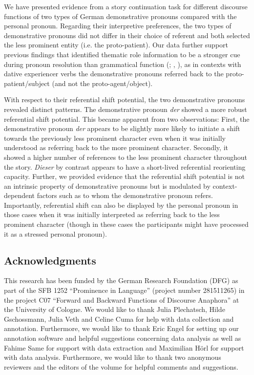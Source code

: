 \documentclass[output=paper,colorlinks,citecolor=brown]{langscibook}
\begin{document}
We have presented evidence from a story continuation task for different discourse functions of two types of German demonstrative pronouns compared with the personal pronoun. Regarding their interpretive preferences, the two types of demonstrative pronouns did not differ in their choice of referent and both selected the less prominent entity (i.e. the proto-patient). Our data further support previous findings that identified thematic role information to be a stronger cue during pronoun resolution than grammatical function (\citealt{StevensonEtAl1994}; \citealt{SchumacherEtAl2016}, \citeyear{SchumacherEtAl2017}), as in contexts with dative experiencer verbs the demonstrative pronouns referred back to the proto-patient/subject (and not the proto-agent/object). 

With respect to their referential shift potential, the two demonstrative pronouns revealed distinct patterns. The demonstrative pronoun \textit{der} showed a more robust referential shift potential. This became apparent from two observations: First, the demonstrative pronoun \textit{der} appears to be slightly more likely to initiate a shift towards the previously less prominent character even when it was initially understood as referring back to the more prominent character. Secondly, it showed a higher number of references to the less prominent character throughout the story. \textit{Dieser} by contrast appears to have a short-lived referential reorienting capacity. Further, we provided evidence that the referential shift potential is not an intrinsic property of demonstrative pronouns but is modulated by context-dependent factors such as to whom the demonstrative pronoun refers. Importantly, referential shift can also be displayed by the personal pronoun in those cases when it was initially interpreted as referring back to the less prominent character (though in these cases the participants might have processed it as a stressed personal pronoun). 

\subsection*{Acknowledgments}

This research has been funded by the German Research Foundation (DFG) as part of the SFB 1252 “Prominence in Language” (project number 281511265) in the project C07 “Forward and Backward Functions of Discourse Anaphora” at the University of Cologne. We would like to thank Julia Plechatsch, Hilde Gschossmann, Julia Veth and Celine Cuma for help with data collection and annotation. Furthermore, we would like to thank Eric Engel for setting up our annotation software and helpful suggestions concerning data analysis as well as Fahime Same for support with data extraction and Maximilian Hörl for support with data analysis. Furthermore, we would like to thank two anonymous reviewers and the editors of the volume for helpful comments and suggestions. 


\sloppy\printbibliography[heading=subbibliography,notkeyword=this]
\end{document}
